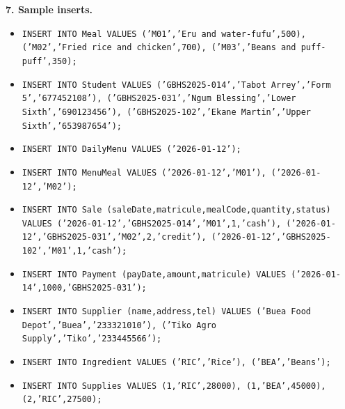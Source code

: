 \documentclass[11pt]{article}
\begin{document}
\textbf{7. Sample inserts.}\par
\begin{itemize}
\item \texttt{INSERT INTO Meal VALUES ('M01','Eru and water-fufu',500), ('M02','Fried rice and chicken',700), ('M03','Beans and puff-puff',350);}
\item \texttt{INSERT INTO Student VALUES ('GBHS2025-014','Tabot Arrey','Form 5','677452108'), ('GBHS2025-031','Ngum Blessing','Lower Sixth','690123456'), ('GBHS2025-102','Ekane Martin','Upper Sixth','653987654');}
\item \texttt{INSERT INTO DailyMenu VALUES ('2026-01-12');}
\item \texttt{INSERT INTO MenuMeal VALUES ('2026-01-12','M01'), ('2026-01-12','M02');}
\item \texttt{INSERT INTO Sale (saleDate,matricule,mealCode,quantity,status) VALUES ('2026-01-12','GBHS2025-014','M01',1,'cash'), ('2026-01-12','GBHS2025-031','M02',2,'credit'), ('2026-01-12','GBHS2025-102','M01',1,'cash');}
\item \texttt{INSERT INTO Payment (payDate,amount,matricule) VALUES ('2026-01-14',1000,'GBHS2025-031');}
\item \texttt{INSERT INTO Supplier (name,address,tel) VALUES ('Buea Food Depot','Buea','233321010'), ('Tiko Agro Supply','Tiko','233445566');}
\item \texttt{INSERT INTO Ingredient VALUES ('RIC','Rice'), ('BEA','Beans');}
\item \texttt{INSERT INTO Supplies VALUES (1,'RIC',28000), (1,'BEA',45000), (2,'RIC',27500);}
\end{itemize}
\end{document}
